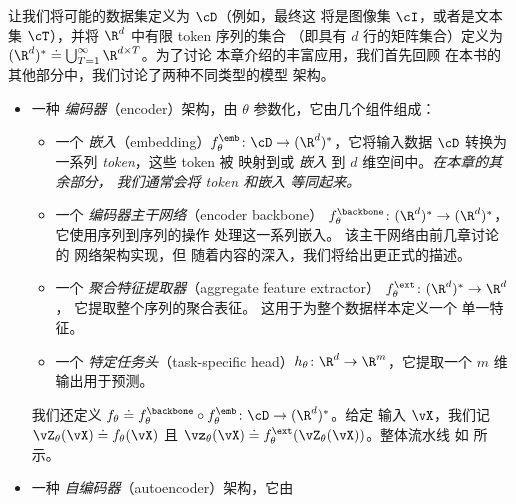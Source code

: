 \documentclass[../../book-main_zh.tex]{subfiles}
\begin{document}
让我们将可能的数据集定义为 \(\cD\)（例如，最终这
    将是图像集 \(\cI\)，或者是文本集
\(\cT\)），并将 \(\R^{d}\) 中有限 token 序列的集合
（即具有 \(d\) 行的矩阵集合）定义为 \((\R^{d})^{*} \doteq
\bigcup_{T = 1}^{\infty}\R^{d \times T}\)。为了讨论
本章介绍的丰富应用，我们首先回顾
在本书的其他部分中，我们讨论了两种不同类型的模型
架构。
\begin{itemize}
    \item 一种 \textit{编码器}（encoder）架构，由
        \(\theta\) 参数化，它由几个组件组成：
        \begin{itemize}
            \item 一个 \textit{嵌入}（embedding）\(f_{\theta}^{\emb} \colon
                \cD \to (\R^{d})^{*}\)，它将输入数据
                \(\cD\) 转换为一系列 \textit{token}，这些 token 被
                映射到或 \textit{嵌入} 到
                \(d\) 维空间中。\textit{在本章的其余部分，
                    我们通常会将 token 和嵌入
                等同起来。}
            \item 一个 \textit{编码器主干网络}（encoder backbone）
                \(f_{\theta}^{\backbone} \colon (\R^{d})^{*} \to
                (\R^{d})^{*}\)，它使用序列到序列的操作
                处理这一系列嵌入。
                该主干网络由前几章讨论的
                网络架构实现，但
                随着内容的深入，我们将给出更正式的描述。
            \item 一个 \textit{聚合特征提取器}（aggregate feature extractor）
                \(f_{\theta}^{\ext} \colon (\R^{d})^{*} \to \R^{d}\)，
                它提取整个序列的聚合表征。
                这用于为整个数据样本定义一个
                单一特征。
            \item 一个 \textit{特定任务头}（task-specific head）\(h_{\theta} \colon
                \R^{d} \to \R^{m}\)，它提取一个
                \(m\) 维输出用于预测。
        \end{itemize}
        我们还定义 \(f_{\theta} \doteq f_{\theta}^{\backbone}
        \circ f_{\theta}^{\emb} \colon \cD \to (\R^{d})^{*}\)。给定
        输入 \(\vX\)，我们记 \(\vZ_{\theta}(\vX) \doteq
        f_{\theta}(\vX)\) 且 \(\vz_{\theta}(\vX) \doteq
        f_{\theta}^{\ext}(\vZ_{\theta}(\vX))\)。整体流水线
        如  所示。
    \item 一种 \textit{自编码器}（autoencoder）架构，它由

\end{itemize}
\end{document}
